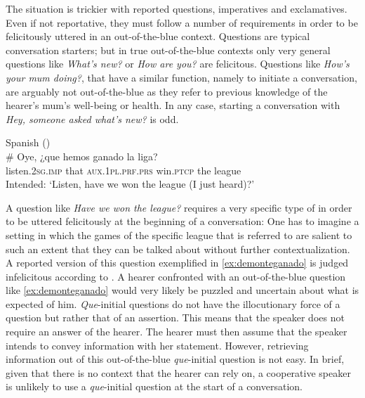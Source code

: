  The situation is trickier with reported questions, imperatives and exclamatives. Even if not reportative, they must follow a number of requirements in order to be felicitously uttered in an out-of-the-blue context. Questions are typical conversation starters; but  in true out-of-the-blue contexts only very general questions like  \emph{What's new?} or \emph{How are you?} are felicitous. Questions like \emph{How's your mum doing?}, that have a similar function, namely to initiate a conversation, are arguably not out-of-the-blue as they refer to previous knowledge of the hearer's mum's well-being or health.  In any case, starting a conversation with \emph{Hey, someone asked what's new?} is odd.
 
\ea Spanish (\citealt[18, ex 16b]{DemonteSoriano2014})\label{ex:demonteganado}\\
\gll  \# Oye, ¿que hemos ganado la liga?\\
      \phantom{\#} listen.\textsc{2sg.imp} that \textsc{aux.1pl.prf.prs} win.\textsc{ptcp} the league\\
\glt  \phantom{\#} Intended: `Listen, have we won the league (I just heard)?'
\z
 
A question like \emph{Have we won the league?}  requires a very specific type of  in order to be uttered felicitously at the beginning of a conversation: One has to imagine a setting in which the games of the specific league that is referred to are salient to such an extent that they can be talked about without further contextualization.  A reported version of this question exemplified in \eqref{ex:demonteganado} is  judged infelicitous according to  \citet{DemonteSoriano2014}. A hearer confronted with an out-of-the-blue question like \eqref{ex:demonteganado} would very likely be puzzled and uncertain about what is expected of him. \emph{Que}-initial questions do not have the illocutionary force of a question but rather that of an assertion. This means that the speaker does not require an answer of the hearer. The hearer must then assume that the speaker intends to convey information with her statement. However, retrieving information out of this out-of-the-blue  \emph{que}-initial question is not easy. In brief, given that there is no context that the hearer can rely on, a cooperative speaker is unlikely to use a   \emph{que}-initial question  at the start of a conversation.


